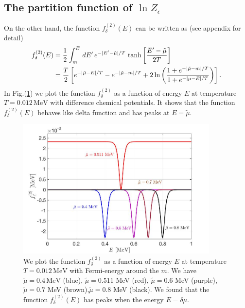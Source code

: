 \documentclass[sn-mathphys,Numbered]{sn-jnl}
\theoremstyle{thmstyleone}%
\theoremstyle{thmstyletwo}%
\theoremstyle{thmstylethree}%
\begin{document}
\subsection{The partition function of $\ln{Z}_\epsilon$}
On the other hand, the function $f^{(2)}_\delta(E)$ can be written as (see appendix for detail)
\begin{align}
f^{(2)}_\delta(E)&=\frac{1}{2}\int^{E}_{m}\,dE^\prime\,e^{-|E^\prime-\tilde\mu|/T}\,\tanh\bigg[\frac{E^\prime-\tilde\mu}{2T}\bigg]\notag\\
&=\frac{T}{2}\left[e^{-|\tilde\mu-E|/T}-e^{-|\tilde\mu-m|/T}+2\ln{\left(\frac{1+e^{-|\tilde\mu-m|/T}}{1+e^{-|\tilde\mu-E|/T}}\right)}\right].
\end{align}
In Fig.(\ref{f_delta002_graph}) we plot the function $f_\delta^{(2)}$ as a function of energy $E$ at temperature $T=0.012\,\mathrm{MeV}$ with difference chemical potentials. It shows that the function $f^{(2)}_\delta(E)$ behaves like delta function and has  peaks at $E=\tilde\mu$.
\begin{figure}[h]
\begin{center}
\includegraphics[width=0.9\textwidth]{./plot/f_delta002}
\caption{We plot the function $f^{(2)}_\delta$ as a function of energy $E$ at temperature $T=0.012\,\mathrm{MeV}$ with Fermi-energy around the $m$. We have $\tilde\mu=0.4\,\mathrm{MeV}$ (blue), $\tilde\mu=0.511$ MeV (red), $\tilde\mu=0.6$ MeV (purple), $\tilde\mu=0.7$ MeV (brown),$\tilde\mu=0.8$ MeV (black). We found that the function $f^{(2)}_\delta(E)$ has peaks when the energy  $E=\delta\mu$. }
\label{f_delta002_graph}
\end{center}
\end{figure}
\end{document}
